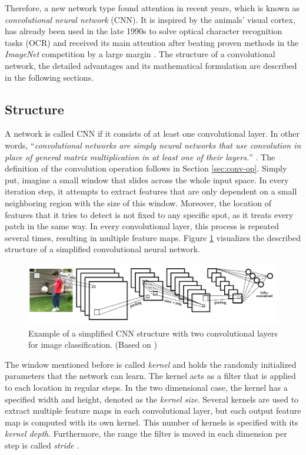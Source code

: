 Therefore, a new network type found attention in recent years, which is known as \textit{convolutional neural network} (CNN). It is inspired by the animals' visual cortex, has already been used in the late 1990s to solve optical character recognition tasks (OCR) \parencite{lecun_conv} and received its main attention after beating proven methods in the \textit{ImageNet} competition by a large margin \parencite{imagenet}. The structure of a convolutional network, the detailed advantages and its mathematical formulation are described in the following sections.


\subsection{Structure}

A network is called CNN if it consists of at least one convolutional layer. In other words, ``\textit{convolutional networks are simply neural networks that use convolution in place of general matrix multiplication in at least one of their layers.}'' \parencite{deep_learning}. The definition of the convolution operation follows in Section \ref{sec:conv-op}. Simply put, imagine a small window that slides across the whole input space. In every iteration step, it attempts to extract features that are only dependent on a small neighboring region with the size of this window. Moreover, the location of features that it tries to detect is not fixed to any specific spot, as it treats every patch in the same way. In every convolutional layer, this process is repeated several times, resulting in multiple feature maps. Figure \ref{fig:cnn-structure} visualizes the described structure of a simplified convolutional neural network.

\begin{figure}[htpb]
	\centering
	\includegraphics[width=1.0\linewidth]{figures/cnn_structure.png}
	\caption[Structure of a CNN]{Example of a simplified CNN structure with two convolutional layers for image classification. (Based on \parencite[p. 2284]{lecun_conv})} \label{fig:cnn-structure}
\end{figure}

The window mentioned before is called \textit{kernel} and holds the randomly initialized parameters that the network can learn. The kernel acts as a filter that is applied to each location in regular steps. In the two dimensional case, the kernel has a specified width and height, denoted as the \textit{kernel size}. Several kernels are used to extract multiple feature maps in each convolutional layer, but each output feature map is computed with its own kernel. This number of kernels is specified with its \textit{kernel depth}. Furthermore, the range the filter is moved in each dimension per step is called \textit{stride} \parencite{conv_guide}.

